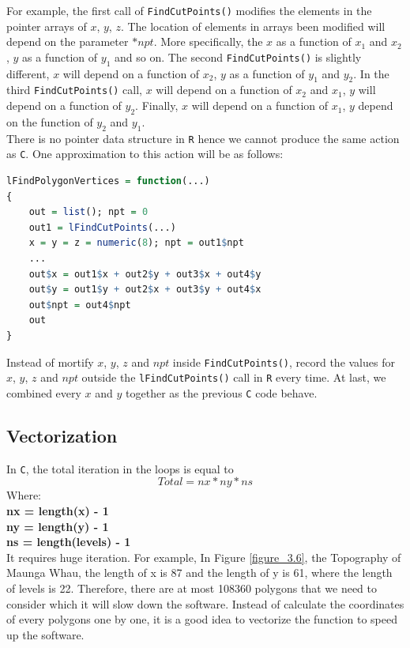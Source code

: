 \documentclass[11pt]{report}
\begin{document}
For example, the first call of \texttt{FindCutPoints()} modifies the elements in the pointer arrays of $x$, $y$, $z$. The location of elements in arrays been modified will depend on the parameter $*npt$. More specifically, the $x$ as a function of $x_1$ and $x_2$, $y$ as a function of $y_1$ and so on. The second \texttt{FindCutPoints()} is slightly different, $x$ will depend on a function of $x_2$, $y$ as a function of $y_1$ and $y_2$. In the third \texttt{FindCutPoints()} call, $x$ will depend on a function of $x_2$ and $x_1$, $y$ will depend on a function of $y_2$. Finally, $x$ will depend on a function of $x_1$, $y$ depend on the function of $y_2$ and $y_1$. \\

There is no pointer data structure in \texttt{R} hence we cannot produce the same action as \texttt{C}. One approximation to this action will be as follows:
\begin{lstlisting}[language = R]
lFindPolygonVertices = function(...)
{
    out = list(); npt = 0
    out1 = lFindCutPoints(...)
    x = y = z = numeric(8); npt = out1$npt
    ...
    out$x = out1$x + out2$y + out3$x + out4$y
    out$y = out1$y + out2$x + out3$y + out4$x
    out$npt = out4$npt
    out
}
\end{lstlisting}
Instead of mortify $x$, $y$, $z$ and $npt$ inside \texttt{FindCutPoints()}, record the values for $x$, $y$, $z$ and $npt$ outside the \texttt{lFindCutPoints()} call in \texttt{R} every time. At last, we combined every $x$ and $y$ together as the previous \texttt{C} code behave. 


\subsection{Vectorization}
In \texttt{C}, the total iteration in the loops is equal to
\begin{equation}
Total = nx * ny * ns
\end{equation}
Where:\\
\textbf{nx = length(x) - 1}\\
\textbf{ny = length(y) - 1}\\
\textbf{ns = length(levels) - 1}\\

It requires huge iteration. For example, In Figure \ref{figure_3.6}, the Topography of Maunga Whau, the length of x is 87 and the length of y is 61, where the length of levels is 22. Therefore, there are at most 108360 polygons that we need to consider which it will slow down the software. Instead of calculate the coordinates of every polygons one by one, it is a good idea to vectorize the function to speed up the software.
\end{document}
